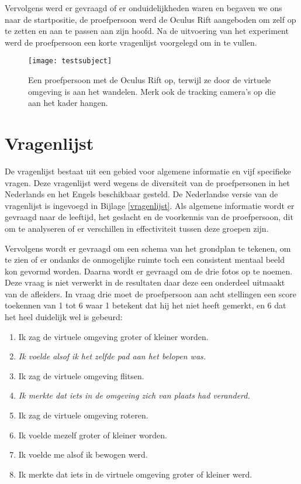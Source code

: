 Vervolgens werd er gevraagd of er onduidelijkheden waren en begaven we ons naar 
de startpositie, de proefpersoon werd de Oculus Rift aangeboden om zelf op te 
zetten en aan te passen aan zijn hoofd. Na de uitvoering van het experiment werd 
de proefpersoon een korte vragenlijst voorgelegd om in te vullen.

\begin{figure}[t!]
    \centering
    \texttt{[image: testsubject]}
    \caption{Een proefpersoon met de Oculus Rift op, terwijl ze door de virtuele
    omgeving is aan het wandelen. Merk ook de tracking camera's op die aan het
    kader hangen.}
    \label{fig:tester}
\end{figure}


\section{Vragenlijst}
De vragenlijst bestaat uit een gebied voor algemene informatie en vijf specifieke
vragen. Deze vragenlijst werd wegens de diversiteit van de proefpersonen in het
Nederlands en het Engels beschikbaar gesteld. De Nederlandse versie van de 
vragenlijst is ingevoegd in Bijlage \ref{vragenlijst}. Als algemene informatie 
wordt er gevraagd naar de leeftijd, het geslacht en de voorkennis van de 
proefpersoon, dit om te analyseren of er verschillen in effectiviteit tussen 
deze groepen zijn. 

Vervolgens wordt er gevraagd om een schema van het grondplan te tekenen, om te
zien of er ondanks de onmogelijke ruimte toch een consistent mentaal beeld kon
gevormd worden. Daarna wordt er gevraagd om de drie fotos op te noemen. Deze
vraag is niet verwerkt in de resultaten daar deze een onderdeel uitmaakt van de
afleiders. In vraag drie moet de proefpersoon aan acht stellingen een score 
toekennen van 1 tot 6 waar 1 betekent dat hij het niet heeft gemerkt, en 6 dat 
het heel duidelijk wel is gebeurd:

\begin{enumerate}
  \item Ik zag de virtuele omgeving groter of kleiner worden.
  \item \emph{Ik voelde alsof ik het zelfde pad aan het belopen was.}
  \item Ik zag de virtuele omgeving flitsen.
  \item \emph{Ik merkte dat iets in de omgeving zich van plaats had veranderd.}
  \item Ik zag de virtuele omgeving roteren.
  \item Ik voelde mezelf groter of kleiner worden.
  \item Ik voelde me alsof ik bewogen werd.
  \item Ik merkte dat iets in de virtuele omgeving groter of kleiner werd.
\end{enumerate}

